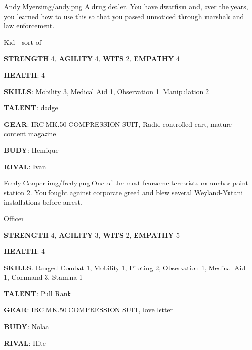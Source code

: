 
\begin{rpg-pcbox}{Andy Myers}{img/andy.png}
    A drug dealer. You have dwarfism and, over the years, you learned how to use this so that you passed unnoticed through marshals and law enforcement. 
\end{rpg-pcbox}

\begin{rpg-commentbox}{}
    Kid - sort of

    \textbf{STRENGTH} 4, \textbf{AGILITY} 4, \textbf{WITS} 2, \textbf{EMPATHY} 4

    \textbf{HEALTH}: 4

    \textbf{SKILLS}: Mobility 3, Medical Aid 1, Observation 1, Manipulation 2
    
    \textbf{TALENT}: dodge
    
    \textbf{GEAR}: IRC MK.50 COMPRESSION SUIT, Radio-controlled cart, mature content magazine

    \textbf{BUDY}: Henrique
    
    \textbf{RIVAL}: Ivan
\end{rpg-commentbox}

\newsect

\medskip \medskip \medskip \medskip \medskip \medskip \medskip \medskip \medskip \medskip \medskip \medskip \medskip \medskip \medskip \medskip \medskip \medskip

\begin{rpg-pcbox}{Fredy Cooperr}{img/fredy.png}
    One of the most fearsome terrorists on anchor point station 2. You fought against corporate greed and blew several Weyland-Yutani installations before arrest. 
\end{rpg-pcbox}

\begin{rpg-commentbox}{}
    Officer

    \textbf{STRENGTH} 4, \textbf{AGILITY} 3, \textbf{WITS} 2, \textbf{EMPATHY} 5

    \textbf{HEALTH}: 4

    \textbf{SKILLS}: Ranged Combat 1, Mobility 1, Piloting 2, Observation 1, Medical Aid 1, Command 3, Stamina 1
    
    \textbf{TALENT}: Pull Rank
    
    \textbf{GEAR}: IRC MK.50 COMPRESSION SUIT, love letter

    \textbf{BUDY}: Nolan
    
    \textbf{RIVAL}: Hite
\end{rpg-commentbox}

